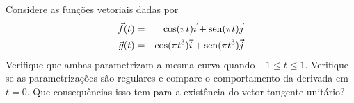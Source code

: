 \begin{exer}
Considere as funções vetoriais dadas por
\begin{eqnarray*}
\vec{f}(t)&=&\cos(\pi t)\vec{i}+\operatorname{sen}(\pi t)\vec{j}\\
\vec{g}(t)&=&\cos(\pi t^3)\vec{i}+\operatorname{sen}(\pi t^3)\vec{j}
\end{eqnarray*}
Verifique que ambas parametrizam a mesma curva quando $-1\leq t \leq 1$. Verifique se as parametrizações são regulares e compare o comportamento da derivada em $t=0$. Que consequências isso tem para a existência do vetor tangente unitário? 
\end{exer}
% 
% 
% 
% 
% 
%       
%       
%  
%   
%   
%       
%   
%   
%   
